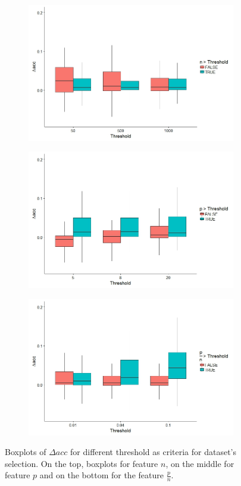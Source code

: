 \documentclass[12pt]{article}
\begin{document}
\begin{figure}[h]
\begin{subfigure}{0.8\textwidth}
  \centering
  \includegraphics[width=.8\linewidth]{Images/Boxplots/boxplotn.jpeg}
\end{subfigure}%

\begin{subfigure}{0.8\textwidth}
  \centering
  \includegraphics[width=.8\linewidth]{Images/Boxplots/boxplotp.jpeg}
\end{subfigure}

\begin{subfigure}{0.8\textwidth}
  \centering
  \includegraphics[width=.8\linewidth]{Images/Boxplots/boxplotpsurn.jpeg}
\end{subfigure}

\caption{Boxplots of $\Delta acc$ for different threshold as criteria for dataset's selection. On the top, boxplots for feature $n$, on the middle for feature $p$ and on the bottom for the feature $\frac{p}{n}$.  }
\label{fig:Boxplots}
\end{figure}
\end{document}
